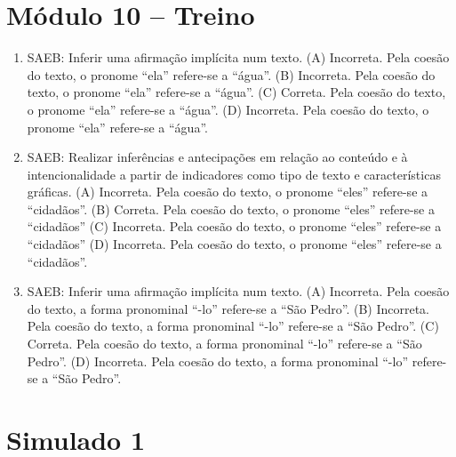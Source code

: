 \section*{Módulo 10 – Treino}

\begin{enumerate}
\item
SAEB: Inferir uma afirmação implícita num texto.
(A) Incorreta. Pela coesão do texto, o pronome ``ela'' refere-se a
``água''.
(B) Incorreta. Pela coesão do texto, o pronome ``ela'' refere-se a
``água''.
(C) Correta. Pela coesão do texto, o pronome ``ela'' refere-se a
``água''.
(D) Incorreta. Pela coesão do texto, o pronome ``ela'' refere-se a
``água''.

\item
SAEB: Realizar inferências e antecipações em relação ao conteúdo
e à intencionalidade a partir de indicadores como tipo de texto e
características gráficas.
(A) Incorreta. Pela coesão do texto, o pronome ``eles'' refere-se a
``cidadãos''.
(B) Correta. Pela coesão do texto, o pronome ``eles'' refere-se a
``cidadãos''
(C) Incorreta. Pela coesão do texto, o pronome ``eles'' refere-se a
``cidadãos''
(D) Incorreta. Pela coesão do texto, o pronome ``eles'' refere-se a
``cidadãos''.

\item
SAEB: Inferir uma afirmação implícita num texto.
(A) Incorreta. Pela coesão do texto, a forma pronominal ``-lo'' refere-se a
``São Pedro''.
(B) Incorreta. Pela coesão do texto, a forma pronominal ``-lo'' refere-se a
``São Pedro''.
(C) Correta. Pela coesão do texto, a forma pronominal ``-lo'' refere-se a
``São Pedro''.
(D) Incorreta. Pela coesão do texto, a forma pronominal ``-lo'' refere-se a
``São Pedro''.
\end{enumerate}

\section*{Simulado 1}

